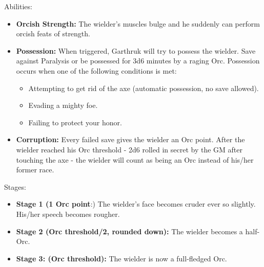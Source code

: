 \documentclass[letterpaper,sansserif,tightsqueeze]{rpg-module}
\begin{document}
Abilities:
\begin{itemize}
	\item \textbf{Orcish Strength:} The wielder's muscles bulge and he suddenly can perform orcish feats of strength.
	\item \textbf{Possession:} When triggered, Garthruk will try to possess the wielder. Save against Paralysis or be possessed for 3d6 minutes by a raging Orc. Possession occurs when one of the following conditions is met:
	\begin{itemize}
		\item Attempting to get rid of the axe (automatic possession, no save allowed).
		\item Evading a mighty foe.
		\item Failing to protect your honor.
	\end{itemize}
	\item \textbf{Corruption:} Every failed save gives the wielder an Orc point. After the wielder reached his Orc threshold - 2d6 rolled in secret by the GM after touching the axe - the wielder will count as being an Orc instead of his/her former race.
\end{itemize}
Stages: 
\begin{itemize}
	\item \textbf{Stage 1 (1 Orc point}:) The wielder's face becomes cruder ever so slightly. His/her speech becomes rougher. 
	\item \textbf{Stage 2 (Orc threshold/2, rounded down):} The wielder becomes a half-Orc.
	\item \textbf{Stage 3: (Orc threshold):} The wielder is now a full-fledged Orc.
\end{itemize}
\end{document}
